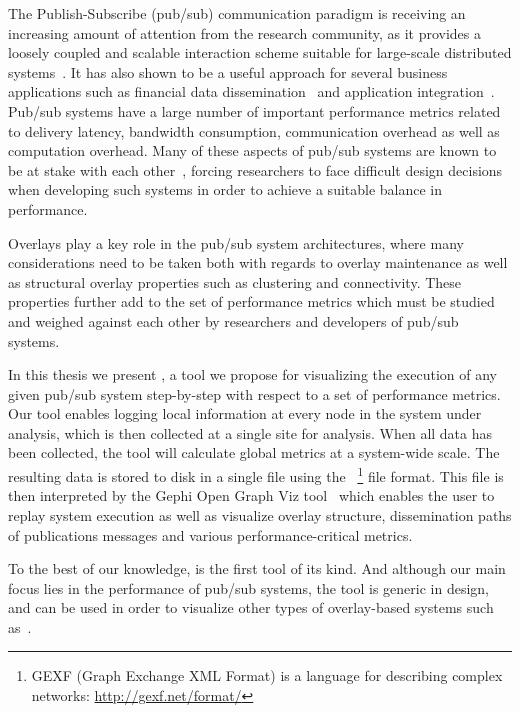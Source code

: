 The Publish-Subscribe (pub/sub) communication paradigm is receiving an
increasing amount of attention from the research community, as it
provides a loosely coupled and scalable interaction scheme suitable for
large-scale distributed systems~\cite{Eugster:2003}. It has also shown
to be a useful approach for several business applications such as
financial data dissemination~\cite{tibcorv} and application
integration~\cite{goops}. Pub/sub systems have a large number of
important performance metrics related to delivery latency, bandwidth
consumption, communication overhead as well as computation overhead.
Many of these aspects of pub/sub systems are known to be at stake with
each other~\cite{Kermarrec:2013, Setty:2012}, forcing researchers to face difficult design
decisions when developing such systems in order to achieve a suitable
balance in performance.

Overlays play a key role in the pub/sub system architectures, where many
considerations need to be taken both with regards to overlay maintenance
as well as structural overlay properties such as clustering and
connectivity. These properties further add to the set of performance
metrics which must be studied and weighed against each other by
researchers and developers of pub/sub systems.

In this thesis we present \demo{}, a tool we propose for visualizing the
execution of any given pub/sub system step-by-step with respect to a set
of performance metrics. Our tool enables logging local information at
every node in the system under analysis, which is then collected at a
single site for analysis. When all data has been collected, the tool
will calculate global metrics at a system-wide scale. The resulting data
is stored to disk in a single file using the
\gexf{}~\footnote{GEXF (Graph Exchange XML Format) is a language for
    describing complex networks: \url{http://gexf.net/format/}} file
format. This file is then interpreted by the Gephi Open Graph Viz
tool~\cite{ICWSM09154} which enables the user to replay system execution
as well as visualize overlay structure, dissemination paths of
publications messages and various performance-critical metrics.

To the best of our knowledge, \demo{} is the first tool of its kind. And
although our main focus lies in the performance of pub/sub
systems, the tool is generic in design, and can be used in order to
visualize other types of overlay-based systems such as~\cite{Loukos:2014}.

